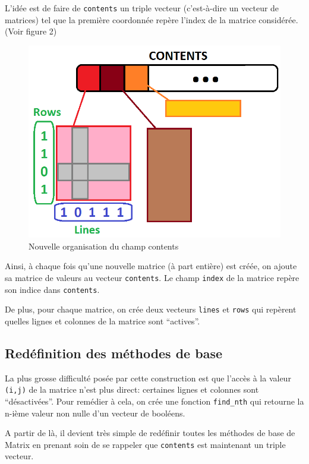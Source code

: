 \documentclass[a4paper,11pt]{article}
\begin{document}
L'idée est de faire de \texttt{contents} un triple vecteur (c'est-à-dire un vecteur de matrices) tel que la première coordonnée repère l'index de la matrice considérée. (Voir figure 2)

\begin{figure}
  \centering
  \includegraphics[scale=0.5]{matimpli.png}
  \caption{Nouvelle organisation du champ contents}
  \label{fig:phd}
\end{figure}

Ainsi, à chaque fois qu'une nouvelle matrice (à part entière) est créée, on ajoute sa matrice de valeurs au vecteur \texttt{contents}. Le champ \texttt{index} de la matrice repère son indice dans \texttt{contents}.

De plus, pour chaque matrice, on crée deux vecteurs \texttt{lines} et \texttt{rows} qui repèrent quelles lignes et colonnes de la matrice sont ``actives''.


\subsection{Redéfinition des méthodes de base}

La plus grosse difficulté posée par cette construction est que l'accès à la valeur \texttt{(i,j)} de la matrice n'est plus direct: certaines lignes et colonnes sont ``désactivées''. 
Pour remédier à cela, on crée une fonction \texttt{find\_nth} qui retourne la n-ième valeur non nulle d'un vecteur de booléens.

A partir de là, il devient très simple de redéfinir toutes les méthodes de base de Matrix en prenant soin de se rappeler que \texttt{contents} est maintenant un triple vecteur.
\end{document}
